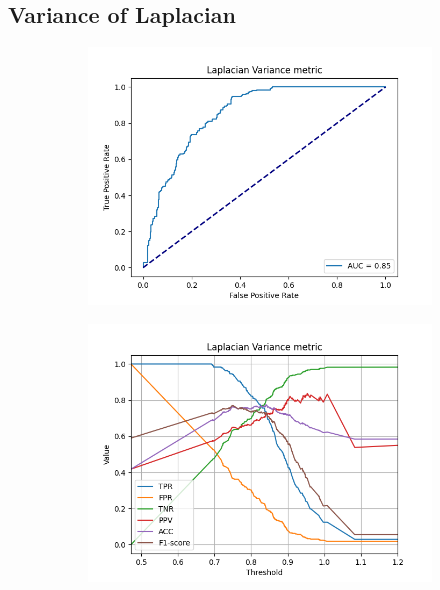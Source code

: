 \subsection{Variance of Laplacian}
\begin{figure}[H]
    \centering
    \begin{subfigure}[t]{0.48\textwidth}
        \includegraphics[width=\textwidth]{Figures/results_on_thresholds/output_roc_lv.png}
        \caption{}
        \label{fig:LV_roc}
    \end{subfigure}\hspace{1em}
    \begin{subfigure}[t]{0.48\textwidth}
        \includegraphics[width=\textwidth]{Figures/results_on_thresholds/threshold_test_scores_lv.png}

\end{subfigure}
\end{figure}
